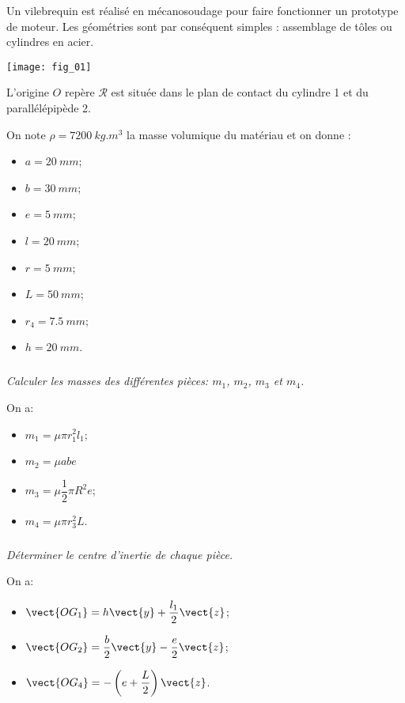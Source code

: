 \ifprof
\else
\begin{multicols}{2}
\fi


\ifprof
\else
Un vilebrequin est réalisé en mécanosoudage pour faire fonctionner un prototype de moteur. Les géométries sont par conséquent simples : assemblage de tôles ou cylindres en acier.

\begin{center}
\texttt{[image: fig\_01]}
\end{center}
L'origine $O$ repère $\mathcal{R}$ est située dans le plan de contact du cylindre 1 et du parallélépipède 2.

On note $\rho=\SI{7200}{kg.m^{3}}$ la masse volumique du matériau et on donne :
\begin{multicols}{2}
\begin{itemize}
\item $a = \SI{20}{mm}$;
\item $b = \SI{30}{mm}$;
\item $e = \SI{5}{mm}$;
\item $l = \SI{20}{mm}$;
\item $r = \SI{5}{mm}$;
\item $L = \SI{50}{mm}$;
\item $r_4 = \SI{7.5}{mm}$;
\item $h = \SI{20}{mm}$.
\end{itemize}
\end{multicols}
\fi

\subparagraph{}\textit{Calculer les masses des différentes pièces: $m_1$, $m_2$, $m_3$ et $m_4$.}

\ifprof \begin{corrige}
On a: 
\begin{itemize}
\item $m_1 = \mu \pi r_1^2 l_1$;
\item $m_2 = \mu a b e$
\item $m_3 = \mu \dfrac{1}{2}\pi R^2 e$;
\item $m_4 = \mu \pi r_3^2L$.
\end{itemize}
\end{corrige}
\else
\fi


\subparagraph{}\textit{Déterminer le centre d’inertie de chaque pièce.}
\ifprof \begin{corrige}
On a: 
\begin{itemize}
\item $\vect{OG_1} = h\vect{y}+\dfrac{l_1}{2}\vect{z}$;
\item $\vect{OG_2} = \dfrac{b}{2}\vect{y}-\dfrac{e}{2}\vect{z}$;
\item $\vect{OG_4} = -\left(e+\dfrac{L}{2}\right)\vect{z}$.
\end{itemize}


\end{corrige}
\end{multicols}
